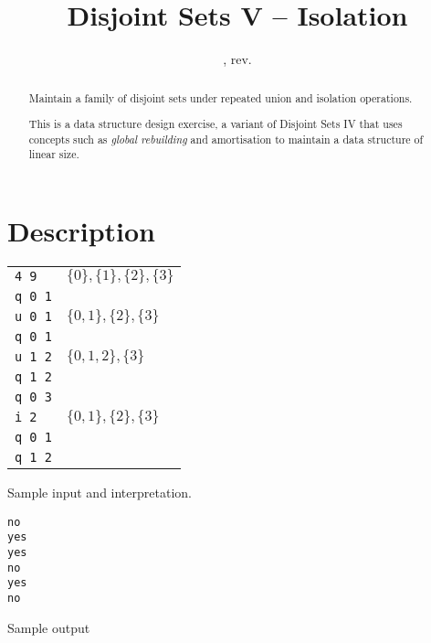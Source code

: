 \documentclass{tufte-handout}
\title{Disjoint Sets V -- Isolation}
\author{}
\date{\GITAuthorDate, rev. \GITAbrHash}
\begin{document}
\maketitle

\begin{abstract}
  Maintain a family of disjoint sets under repeated union and isolation operations.

  This is a data structure design exercise, a  variant of Disjoint Sets IV that uses concepts such as \emph{global rebuilding} and amortisation to maintain a data structure of linear size.
\end{abstract}

\section{Description}
\begin{marginfigure}
  \begin{tabular}{ll}
    \texttt{4 9}   & $\{0\}, \{1\}, \{2\},\{3\}$\\
    \texttt{q 0 1} \\
    \texttt{u 0 1} & $\{0, 1\}, \{2\},\{3\}$ \\
    \texttt{q 0 1} &\\
    \texttt{u 1 2} & $\{0, 1, 2\},\{3\}$ \\
    \texttt{q 1 2} &\\
    \texttt{q 0 3} &\\
    \texttt{i 2}   & $\{0, 1\}, \{2\},\{3\}$ \\
    \texttt{q 0 1} &\\
    \texttt{q 1 2} &
  \end{tabular}
  \caption{Sample input and interpretation.}
\end{marginfigure}

\begin{marginfigure}
  \begin{verbatim}
no
yes
yes
no
yes
no
  \end{verbatim}
  \caption{Sample output}
\end{marginfigure}
\end{document}
